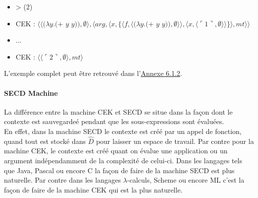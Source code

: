 \documentclass[10pt,a4paper]{article}
\begin{document}
\begin{itemize}
					\item[] > (2) 
					\item[] CEK : $\langle\langle(\lambda y.(+$ $y$ $y)),\emptyset\rangle,\langle arg,\langle x,\{\langle f,\langle(\lambda y.(+$ $y$ $y)),\emptyset\rangle\rangle,\langle x,\langle\ulcorner 1\urcorner,\emptyset\rangle\rangle\}\rangle,mt\rangle\rangle$
					\item[] ...
					\item[] CEK : $\langle\langle\ulcorner 2\urcorner,\emptyset\rangle,mt\rangle$
				\end{itemize}
				\medbreak
				
				L'exemple complet peut être retrouvé dans l'\hyperref[CEK]{Annexe 6.1.2}.
				\bigbreak
				
			
			\paragraph{SECD Machine}
			
				La différence entre la machine CEK et SECD se situe dans la façon dont le contexte est sauvegardeé pendant que les sous-expressions sont évaluées.\\
				En effet, dans la machine SECD le contexte est créé par un appel de fonction, quand tout est stocké dans $\widehat{D}$ pour laisser un espace de travail. Par contre pour la machine CEK, le contexte est créé quant on évalue une application ou un argument indépendamment de la complexité de celui-ci.
				\smallbreak 
				Dans les langages tels que Java, Pascal ou encore C la façon de faire de la machine SECD est plus naturelle. Par contre  dans les langages $\lambda$-calculs, Scheme ou encore ML c'est la façon de faire de la machine CEK qui est la plus naturelle.
				\medbreak
				
\end{document}
